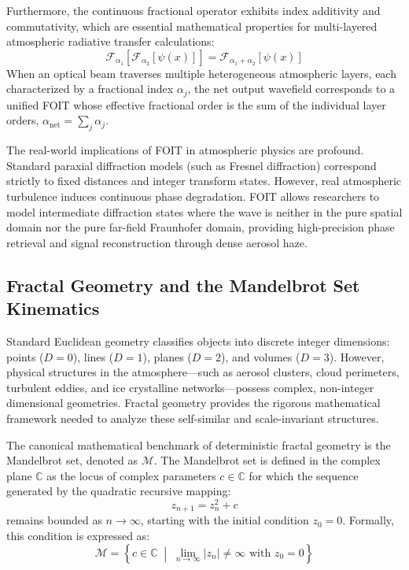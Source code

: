 \documentclass{article}
\begin{document}
Furthermore, the continuous fractional operator exhibits index additivity and commutativity, which are essential mathematical properties for multi-layered atmospheric radiative transfer calculations:
\begin{equation}
\mathcal{F}_{\alpha_1} \left[ \mathcal{F}_{\alpha_2} [\psi(x)] \right] = \mathcal{F}_{\alpha_1 + \alpha_2} [\psi(x)]
\end{equation}
When an optical beam traverses multiple heterogeneous atmospheric layers, each characterized by a fractional index $\alpha_j$, the net output wavefield corresponds to a unified FOIT whose effective fractional order is the sum of the individual layer orders, $\alpha_{\text{net}} = \sum_{j} \alpha_j$.

The real-world implications of FOIT in atmospheric physics are profound. Standard paraxial diffraction models (such as Fresnel diffraction) correspond strictly to fixed distances and integer transform states. However, real atmospheric turbulence induces continuous phase degradation. FOIT allows researchers to model intermediate diffraction states where the wave is neither in the pure spatial domain nor the pure far-field Fraunhofer domain, providing high-precision phase retrieval and signal reconstruction through dense aerosol haze.

\subsection{Fractal Geometry and the Mandelbrot Set Kinematics}

Standard Euclidean geometry classifies objects into discrete integer dimensions: points ($D=0$), lines ($D=1$), planes ($D=2$), and volumes ($D=3$). However, physical structures in the atmosphere—such as aerosol clusters, cloud perimeters, turbulent eddies, and ice crystalline networks—possess complex, non-integer dimensional geometries. Fractal geometry provides the rigorous mathematical framework needed to analyze these self-similar and scale-invariant structures.

The canonical mathematical benchmark of deterministic fractal geometry is the Mandelbrot set, denoted as $\mathcal{M}$. The Mandelbrot set is defined in the complex plane $\mathbb{C}$ as the locus of complex parameters $c \in \mathbb{C}$ for which the sequence generated by the quadratic recursive mapping:
\begin{equation}
z_{n+1} = z_n^2 + c
\end{equation}
remains bounded as $n \to \infty$, starting with the initial condition $z_0 = 0$. Formally, this condition is expressed as:
\begin{equation}
\mathcal{M} = \left\{ c \in \mathbb{C} \;\middle|\; \lim_{n \to \infty} |z_n| \neq \infty \text{ with } z_0 = 0 \right\}
\end{equation}
\end{document}
